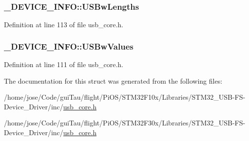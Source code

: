 \hypertarget{struct___d_e_v_i_c_e___i_n_f_o_ac5ddedbe1c26f4b7baa6fe036ac7bdbe}{
\subsubsection[{U\-S\-Bw\-Lengths}]{ \-\_\-\-D\-E\-V\-I\-C\-E\-\_\-\-I\-N\-F\-O\-::\-U\-S\-Bw\-Lengths}}\label{struct___d_e_v_i_c_e___i_n_f_o_ac5ddedbe1c26f4b7baa6fe036ac7bdbe}


Definition at line 113 of file usb\-\_\-core.\-h.

\hypertarget{struct___d_e_v_i_c_e___i_n_f_o_a467c50f521daf1bbee06bf132f2f7bf1}{
\subsubsection[{U\-S\-Bw\-Values}]{ \-\_\-\-D\-E\-V\-I\-C\-E\-\_\-\-I\-N\-F\-O\-::\-U\-S\-Bw\-Values}}\label{struct___d_e_v_i_c_e___i_n_f_o_a467c50f521daf1bbee06bf132f2f7bf1}


Definition at line 111 of file usb\-\_\-core.\-h.



The documentation for this struct was generated from the following files\-:\begin{DoxyCompactItemize}
\item 
/home/jose/\-Code/gui\-Tau/flight/\-Pi\-O\-S/\-S\-T\-M32\-F10x/\-Libraries/\-S\-T\-M32\-\_\-\-U\-S\-B-\/\-F\-S-\/\-Device\-\_\-\-Driver/inc/\hyperlink{_s_t_m32_f10x_2_libraries_2_s_t_m32___u_s_b-_f_s-_device___driver_2inc_2usb__core_8h}{usb\-\_\-core.\-h}\item 
/home/jose/\-Code/gui\-Tau/flight/\-Pi\-O\-S/\-S\-T\-M32\-F30x/\-Libraries/\-S\-T\-M32\-\_\-\-U\-S\-B-\/\-F\-S-\/\-Device\-\_\-\-Driver/inc/\hyperlink{_s_t_m32_f30x_2_libraries_2_s_t_m32___u_s_b-_f_s-_device___driver_2inc_2usb__core_8h}{usb\-\_\-core.\-h}\end{DoxyCompactItemize}
